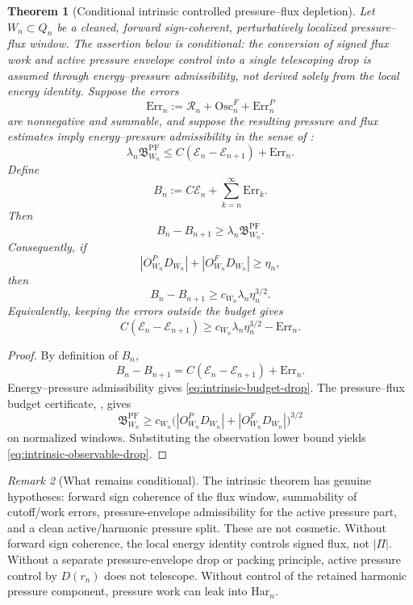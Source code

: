 \documentclass[11pt]{article}
\numberwithin{equation}{section}
\theoremstyle{plain}
\newtheorem{theorem}{Theorem}[section]
\theoremstyle{definition}
\theoremstyle{remark}
\newtheorem{remark}[theorem]{Remark}
\newcommand{\PF}{\mathrm{PF}}
\newcommand{\Har}{\mathrm{Har}}
\newcommand{\Err}{\mathrm{Err}}
\newcommand{\calE}{\mathcal E}
\newcommand{\calR}{\mathcal R}
\newcommand{\bfB}{\mathfrak B}
\begin{document}
\begin{theorem}[Conditional intrinsic controlled pressure--flux depletion]
\label{thm:intrinsic-controlled-pf-depletion}
Let \(W_n\subset Q_n\) be a cleaned, forward sign-coherent, perturbatively localized pressure--flux window.  The assertion below is conditional: the conversion of signed flux work and active pressure envelope control into a single telescoping drop is assumed through energy--pressure admissibility, not derived solely from the local energy identity.  Suppose the errors
\[
        \Err_n:=\calR_n+\mathrm{Osc}^F_n+\Err^P_n
\]
are nonnegative and summable, and suppose the resulting pressure and flux estimates imply energy--pressure admissibility in the sense of :
\[
        \lambda_n\bfB^{\PF}_{W_n}
        \le
        C(\calE_n-\calE_{n+1})+\Err_n.
\]
Define
\[
        B_n:=C\calE_n+\sum_{k=n}^{\infty}\Err_k.
\]
Then
\begin{equation}
        B_n-B_{n+1}
        \ge
        \lambda_n\bfB^{\PF}_{W_n}.
        \label{eq:intrinsic-budget-drop}
\end{equation}
Consequently, if
\[
        |O^P_{W_n}D_{W_n}|+|O^F_{W_n}D_{W_n}|\ge\eta_n,
\]
then
\begin{equation}
        B_n-B_{n+1}
        \ge
        c_{W_n}\lambda_n\eta_n^{3/2}.
        \label{eq:intrinsic-observable-drop}
\end{equation}
Equivalently, keeping the errors outside the budget gives
\[
        C(\calE_n-\calE_{n+1})
        \ge
        c_{W_n}\lambda_n\eta_n^{3/2}-\Err_n.
\]
\end{theorem}

\begin{proof}
By definition of \(B_n\),
\[
        B_n-B_{n+1}
        =
        C(\calE_n-\calE_{n+1})+\Err_n.
\]
Energy--pressure admissibility gives \eqref{eq:intrinsic-budget-drop}.  The pressure--flux budget certificate, , gives
\[
        \bfB^{\PF}_{W_n}
        \ge
        c_{W_n}
        \bigl(|O^P_{W_n}D_{W_n}|+|O^F_{W_n}D_{W_n}|\bigr)^{3/2}
\]
on normalized windows.  Substituting the observation lower bound yields \eqref{eq:intrinsic-observable-drop}.
\end{proof}

\begin{remark}[What remains conditional]
The intrinsic theorem has genuine hypotheses: forward sign coherence of the flux window, summability of cutoff/work errors, pressure-envelope admissibility for the active pressure part, and a clean active/harmonic pressure split.  These are not cosmetic.  Without forward sign coherence, the local energy identity controls signed flux, not \(|\Pi|\).  Without a separate pressure-envelope drop or packing principle, active pressure control by \(D(r_n)\) does not telescope.  Without control of the retained harmonic pressure component, pressure work can leak into \(\Har_n\).
\end{remark}
\end{document}
